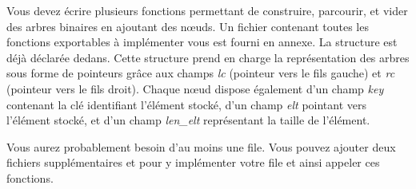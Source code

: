 

\vspace*{0.7cm}

\noindent {}

\bigskip

%

\noindent Vous devez écrire plusieurs fonctions permettant de construire, parcourir, et vider des arbres binaires en ajoutant des nœuds.
Un fichier  contenant toutes les fonctions exportables à implémenter vous est fourni en annexe.
La structure  est déjà déclarée dedans.
Cette structure prend en charge la représentation des arbres sous forme de pointeurs grâce aux champs \textit{lc} (pointeur vers le fils gauche) et \textit{rc} (pointeur vers le fils droit).
Chaque nœud dispose également d'un champ \textit{key} contenant la clé identifiant l'élément stocké, d'un champ \textit{elt} pointant vers l'élément stocké, et d'un champ \textit{len\_elt} représentant la taille de l'élément.

\smallskip

\noindent Vous aurez probablement besoin d'au moins une file.
Vous pouvez ajouter deux fichiers supplémentaires  et  pour y implémenter votre file et ainsi appeler ces fonctions.

